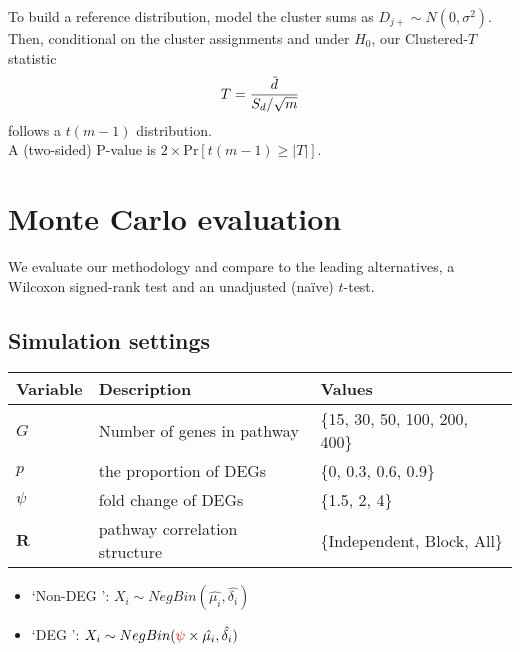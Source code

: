\documentclass[a0,portrait]{a0poster}
\newcommand*{\barbar}[1]{\overline{\overline{#1}}}
\newcommand{\overbar}[1]{\mkern 3mu\overline{\mkern-3mu#1\mkern-1.mu}\mkern 1.mu}
\begin{document}
\begin{multicols}{3}
\noindent To build a reference distribution, model the cluster sums as $D_{j\scriptscriptstyle{+}} \sim N(0, \sigma^2)$. Then, conditional on the cluster assignments and under $H_0$, our Clustered-$T$ statistic\\
\begin{equation}
  \label{eq:tstat}
T =  \frac{\overbar{d}}{S_d/\sqrt{m}}
\end{equation}
follows a $t(m-1)$ distribution. \\
A (two-sided) P-value is $2\times\text{Pr}[t(m-1) \ge |T|]$.


\section{Monte Carlo evaluation}
We evaluate our methodology and compare to the leading alternatives, a Wilcoxon signed-rank test and an unadjusted (na\"ive) $t$-test.
\subsection{Simulation settings}
\begin{center}
\begin{tabular}{lll}
Variable & Description & Values\\
\hline
$G$ & Number of genes in pathway & \{15, 30, 50, 100, 200, 400\}\\
$p$ & the proportion of DEGs & \{0, 0.3, 0.6, 0.9\}\\
$\psi$ & fold change of DEGs & \{1.5, 2, 4\}\\
$\mathbf{R}$ & pathway correlation structure & \{Independent, Block, All\}\\
\end{tabular}
\end{center}
\begin{itemize}
\item \lq Non-DEG \rq: \(X_{i} \sim NegBin(\hat{\mu_{i}},\hat{\delta_{i}})\)
\item \lq DEG \rq: \(X_{i} \sim NegBin(\color{Red}\psi \color{Black} \times \hat{\mu_{i}},\hat{\delta_{i}})\)
\end{itemize}


\end{multicols}
\end{document}
